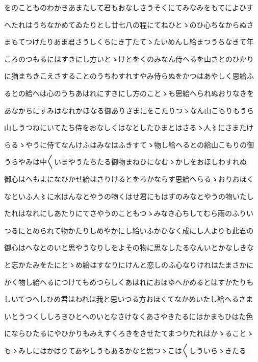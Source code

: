 \documentclass[a4paper,11pt,landscape]{ltjtarticle}
\begin{document}
\par\medskip
をのことものわかきあまたして君もおなしさうそくにてみなみをもてによひす
\par\medskip
へたれはうちなかめてゐたりとし廿七八の程にてねひとゝのひ心ちなからぬさ
\par\medskip
まもてつけたりあま君さうしくちにき丁たてゝたいめんし給まつうちなきて年
\par\medskip
ころのつもるにはすきにし方いとゝけとをくのみなん侍へるを山さとのひかり
\par\medskip
に猶まちきこえさすることのうちわすれすやみ侍らぬをかつはあやしく思給ふ
\par\medskip
るとの給へは心のうちあはれにすきにし方のことゝも思給へられぬおりなきを
\par\medskip
あなかちにすみはなれかほなる御ありさまにをこたりつゝなん山こもりもうら
\par\medskip
山しうつねにいてたち侍をおなしくはなとしたひまとはさるゝ人〻にさまたけ
\par\medskip
らるゝやうに侍てなんけふはみなはふきすてゝ物し給へるとの給山こもりの御
\par\medskip
うらやみは中〱いまやうたちたる御物まねひになむゝかしをおほしわすれぬ
\par\medskip
御心はへもよになひかせ給はさりけるとをろかならす思給へらるゝおりおほく
\par\medskip
なといふ人〻に水はんなとやうの物くはせ君にもはすのみなとやうの物いたし
\par\medskip
たれはなれにしあたりにてさやうのこともつゝみなき心ちしてむら雨のふりい
\par\medskip
つるにとめられて物かたりしめやかにし給いふかひなく成にし人よりも此君の
\par\medskip
御心はへなとのいと思やうなりしをよその物に思なしたるなんいとかなしきな
\par\medskip
と忘かたみをたにとゝめ給はすなりにけんと恋しのふ心なりけれはたまさかに
\par\medskip
かく物し給へるにつけてもめつらしくあはれにおほゆへかめるとはすかたりも
\par\medskip
しいてつへしひめ君はわれは我と思いつる方おほくてなかめいたし給へるさま
\par\medskip
いとうつくししろきひとへのいとなさけなくあさやきたるにはかまもひはた色
\par\medskip
にならひたるにやひかりもみえすくろきをきせたてまつりたれはかゝることゝ
\par\medskip
もゝみしにはかはりてあやしうもあるかなと思つゝこは〱しういらゝきたる
\end{document}
